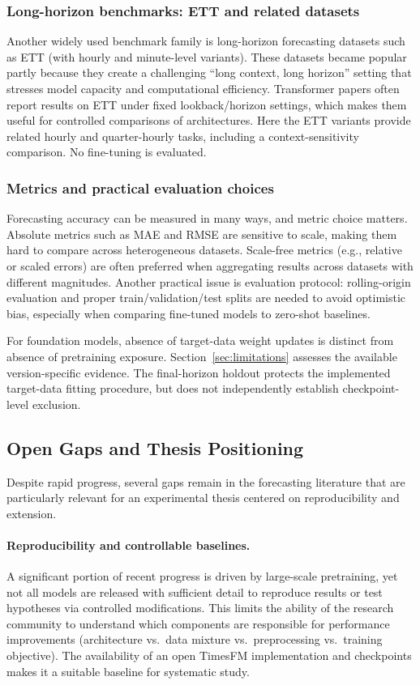 \subsubsection{Long-horizon benchmarks: ETT and related datasets}
Another widely used benchmark family is long-horizon forecasting datasets such as ETT (with hourly and minute-level variants). These datasets became popular partly because they create a challenging ``long context, long horizon'' setting that stresses model capacity and computational efficiency. Transformer papers often report results on ETT under fixed lookback/horizon settings, which makes them useful for controlled comparisons of architectures. Here the ETT variants provide related hourly and quarter-hourly tasks, including a context-sensitivity comparison. No fine-tuning is evaluated.

\subsubsection{Metrics and practical evaluation choices}
Forecasting accuracy can be measured in many ways, and metric choice matters. Absolute metrics such as MAE and RMSE are sensitive to scale, making them hard to compare across heterogeneous datasets. Scale-free metrics (e.g., relative or scaled errors) are often preferred when aggregating results across datasets with different magnitudes. Another practical issue is evaluation protocol: rolling-origin evaluation and proper train/validation/test splits are needed to avoid optimistic bias, especially when comparing fine-tuned models to zero-shot baselines.

For foundation models, absence of target-data weight updates is distinct from absence of pretraining exposure. Section~\ref{sec:limitations} assesses the available version-specific evidence. The final-horizon holdout protects the implemented target-data fitting procedure, but does not independently establish checkpoint-level exclusion.

\subsection{Open Gaps and Thesis Positioning}

Despite rapid progress, several gaps remain in the forecasting literature that are particularly relevant for an experimental thesis centered on reproducibility and extension.

\paragraph{Reproducibility and controllable baselines.}
A significant portion of recent progress is driven by large-scale pretraining, yet not all models are released with sufficient detail to reproduce results or test hypotheses via controlled modifications. This limits the ability of the research community to understand which components are responsible for performance improvements (architecture vs.\ data mixture vs.\ preprocessing vs.\ training objective). The availability of an open TimesFM implementation and checkpoints makes it a suitable baseline for systematic study.

